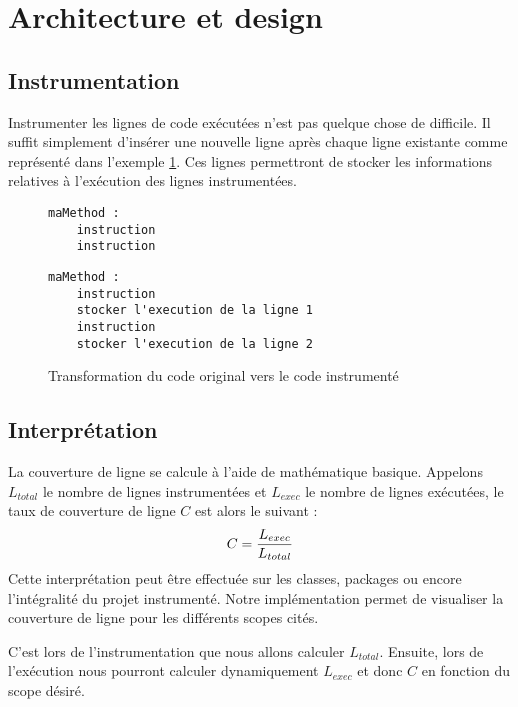 \section{Architecture et design}

\subsection{Instrumentation}
\label{instrumentation}

Instrumenter les lignes de code exécutées n'est pas quelque chose de difficile. Il suffit simplement d'insérer une nouvelle ligne après chaque ligne existante comme représenté dans l'exemple   \ref{example_instrumentation}. Ces lignes permettront de stocker les informations relatives à l'exécution des lignes instrumentées.

\begin{figure}[h]

\begin{minipage}{.45\linewidth}

\begin{lstlisting}[linewidth=5.0cm]
maMethod :		
	instruction
	instruction
\end{lstlisting}

\end{minipage}
\hfill
\begin{minipage}{.45\linewidth}

\begin{lstlisting}[linewidth=11cm]
maMethod :
	instruction
	stocker l'execution de la ligne 1
	instruction
	stocker l'execution de la ligne 2
\end{lstlisting}

\end{minipage}


\caption{Transformation du code original vers le code instrumenté}
\label{example_instrumentation}
\end{figure}

\subsection{Interprétation}
\label{interpretation}

La couverture de ligne se calcule à l'aide de mathématique basique. Appelons $L_{total}$ le nombre de lignes instrumentées et $L_{exec}$ le nombre de lignes exécutées, le taux de couverture de ligne $C$ est alors le suivant :
\begin{equation}
C = { L_{exec} \over L_{total} }
\end{equation}
Cette interprétation peut être effectuée sur les classes, packages ou encore l'intégralité du projet instrumenté. Notre implémentation permet de visualiser la couverture de ligne pour les différents scopes cités.
\par C'est lors de l'instrumentation que nous allons calculer $L_{total}$. Ensuite, lors de l'exécution nous pourront calculer dynamiquement $L_{exec}$ et donc $C$ en fonction du scope désiré.


